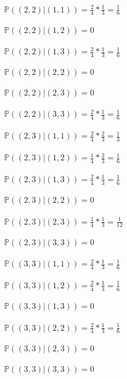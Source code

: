 \documentclass{article}
\begin{document}
$\mathbb{P}((2,2) | (1,1)) = \frac{2}{4} * \frac{1}{3} = \frac{1}{6}$\\ \\
$\mathbb{P}((2,2) | (1,2)) = 0$\\ \\
$\mathbb{P}((2,2) | (1,3)) = \frac{2}{4} * \frac{1}{3} = \frac{1}{6}$\\ \\
$\mathbb{P}((2,2) | (2,2)) = 0$\\ \\
$\mathbb{P}((2,2) | (2,3)) = 0$\\ \\
$\mathbb{P}((2,2) | (3,3)) = \frac{2}{4} * \frac{1}{3} = \frac{1}{6}$\\ \\

$\mathbb{P}((2,3) | (1,1)) = \frac{2}{4} * \frac{2}{3} = \frac{1}{3}$\\ \\
$\mathbb{P}((2,3) | (1,2)) = \frac{1}{4} * \frac{2}{3} = \frac{1}{6}$\\ \\
$\mathbb{P}((2,3) | (1,3)) = \frac{2}{4} * \frac{1}{3} = \frac{1}{6}$\\ \\
$\mathbb{P}((2,3) | (2,2)) = 0$\\ \\
$\mathbb{P}((2,3) | (2,3)) = \frac{1}{4} * \frac{1}{3} = \frac{1}{12}$\\ \\
$\mathbb{P}((2,3) | (3,3)) = 0$\\ \\

$\mathbb{P}((3,3) | (1,1)) = \frac{2}{4} * \frac{1}{3} = \frac{1}{6}$\\ \\
$\mathbb{P}((3,3) | (1,2)) = \frac{2}{4} * \frac{1}{3} = \frac{1}{6}$\\ \\
$\mathbb{P}((3,3) | (1,3)) = 0$\\ \\
$\mathbb{P}((3,3) | (2,2)) = \frac{2}{4} * \frac{1}{3} = \frac{1}{6}$\\ \\
$\mathbb{P}((3,3) | (2,3)) = 0$\\ \\
$\mathbb{P}((3,3) | (3,3)) = 0$\\ \\
\end{document}
